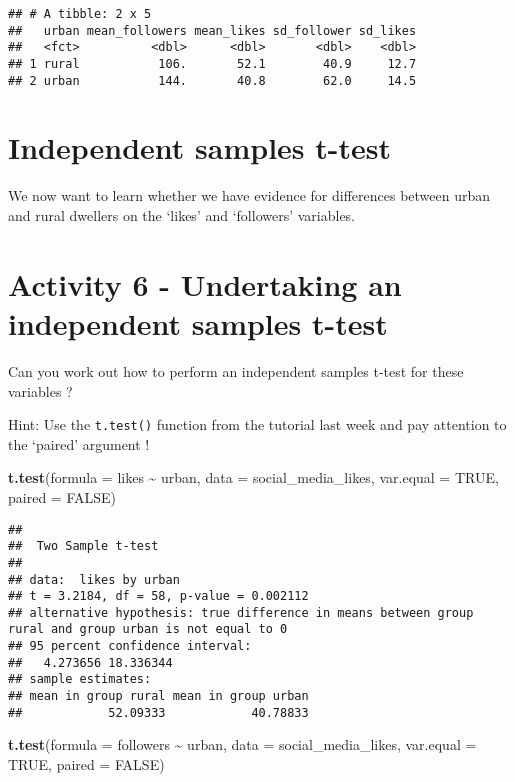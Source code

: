 \documentclass[
]{book}
\newenvironment{Shaded}{\begin{snugshade}}{\end{snugshade}}
\newcommand{\AttributeTok}[1]{\textcolor[rgb]{0.13,0.29,0.53}{#1}}
\newcommand{\ConstantTok}[1]{\textcolor[rgb]{0.56,0.35,0.01}{#1}}
\newcommand{\FunctionTok}[1]{\textcolor[rgb]{0.13,0.29,0.53}{\textbf{#1}}}
\newcommand{\NormalTok}[1]{#1}
\newcommand{\SpecialCharTok}[1]{\textcolor[rgb]{0.81,0.36,0.00}{\textbf{#1}}}
\begin{document}
\begin{verbatim}
## # A tibble: 2 x 5
##   urban mean_followers mean_likes sd_follower sd_likes
##   <fct>          <dbl>      <dbl>       <dbl>    <dbl>
## 1 rural           106.       52.1        40.9     12.7
## 2 urban           144.       40.8        62.0     14.5
\end{verbatim}

\section{Independent samples t-test}\label{independent-samples-t-test}

We now want to learn whether we have evidence for differences between urban and rural dwellers on the `likes' and `followers' variables.

\section{Activity 6 - Undertaking an independent samples t-test}\label{activity-6---undertaking-an-independent-samples-t-test}

Can you work out how to perform an independent samples t-test for these variables ?

Hint: Use the \texttt{t.test()} function from the tutorial last week and pay attention to the `paired' argument !

\begin{Shaded}
\begin{Highlighting}[]
\FunctionTok{t.test}\NormalTok{(}\AttributeTok{formula =}\NormalTok{ likes }\SpecialCharTok{\textasciitilde{}}\NormalTok{ urban, }\AttributeTok{data =}\NormalTok{ social\_media\_likes, }\AttributeTok{var.equal =} \ConstantTok{TRUE}\NormalTok{, }\AttributeTok{paired =} \ConstantTok{FALSE}\NormalTok{)}
\end{Highlighting}
\end{Shaded}

\begin{verbatim}
## 
##  Two Sample t-test
## 
## data:  likes by urban
## t = 3.2184, df = 58, p-value = 0.002112
## alternative hypothesis: true difference in means between group rural and group urban is not equal to 0
## 95 percent confidence interval:
##   4.273656 18.336344
## sample estimates:
## mean in group rural mean in group urban 
##            52.09333            40.78833
\end{verbatim}

\begin{Shaded}
\begin{Highlighting}[]
\FunctionTok{t.test}\NormalTok{(}\AttributeTok{formula =}\NormalTok{ followers }\SpecialCharTok{\textasciitilde{}}\NormalTok{ urban, }\AttributeTok{data =}\NormalTok{ social\_media\_likes, }\AttributeTok{var.equal =} \ConstantTok{TRUE}\NormalTok{, }\AttributeTok{paired =} \ConstantTok{FALSE}\NormalTok{)}
\end{Highlighting}
\end{Shaded}
\end{document}
